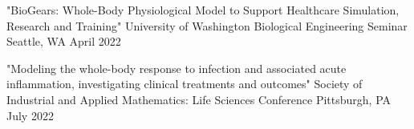 \begin{cventries}
  \cventry
    {"BioGears: Whole-Body Physiological Model to Support Healthcare Simulation, Research and Training"} %
    {University of Washington Biological Engineering Seminar} %
    {Seattle, WA} %
    {April 2022} %
     {
     }

  \cventry
    {"Modeling the whole-body response to infection and associated acute inflammation, investigating clinical treatments and outcomes"} %
    {Society of Industrial and Applied Mathematics: Life Sciences Conference} %
    {Pittsburgh, PA} %
    {July 2022} %
     {
     }

\end{cventries}
